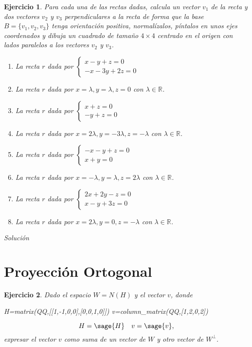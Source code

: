 \documentclass{amsart}
\newtheorem{ejer}{Ejercicio}
\begin{document}
\begin{ejer}
Para cada una de las rectas dadas, calcula un vector $v_1$ de la recta y dos vectores 
$v_2$ y $v_3$ perpendiculares a la recta de forma que la base $B = \{v_1,v_2,v_3\}$ tenga 
orientación positiva, normalízalos, píntalos en unos ejes coordenados y dibuja un cuadrado de 
tamaño $4\times 4$ centrado en el origen con lados paralelos a los vectores $v_2$ y $v_3$.

\begin{enumerate}
\item La recta $r$ dada por $\begin{cases} x-y+z = 0 \\ -x-3y+2z = 0 \end{cases} $
\item La recta $r$ dada por $x = \lambda, y = \lambda, z = 0$ con $\lambda \in {\mathbb R}$.
\item La recta $r$ dada por $\begin{cases} x+z = 0 \\ -y+z = 0 \end{cases} $
\item La recta $r$ dada por $x = 2\lambda, y = -3\lambda, z = -\lambda$ con $\lambda \in {\mathbb R}$.
\item La recta $r$ dada por $\begin{cases} -x-y+z = 0 \\ x+y = 0 \end{cases} $
\item La recta $r$ dada por $x = -\lambda, y = \lambda, z = 2\lambda$ con $\lambda \in {\mathbb R}$.
\item La recta $r$ dada por $\begin{cases} 2x+2y-z = 0 \\ x-y+3z = 0 \end{cases} $
\item La recta $r$ dada por $x = 2\lambda, y = 0, z = -\lambda$ con $\lambda \in {\mathbb R}$.
\end{enumerate}
\end{ejer}

{\it Solución}



\section{Proyección Ortogonal}

\begin{ejer}
Dado el espacio $W = N(H)$ y el vector $v$, donde

\begin{sageblock}
H=matrix(QQ,[[1,-1,0,0],[0,0,1,0]])
v=column_matrix(QQ,[1,2,0,2])
\end{sageblock}

\[ H = \sage{H} \quad v = \sage{v}, \]
expresar el vector $v$ como suma de un vector de $W$ y otro vector de $W^\perp $.
\end{ejer}
\end{document}
